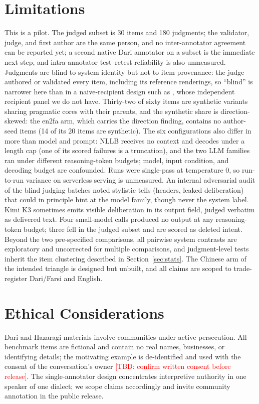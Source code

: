 \documentclass[11pt]{article}
\newcommand{\tbd}[1]{\textcolor{red}{[TBD: #1]}}
\begin{document}
\section{Limitations}
This is a pilot. The judged subset is 30 items and 180 judgments; the validator, judge, and first author are the same person, and no inter-annotator agreement can be reported yet; a second native Dari annotator on a subset is the immediate next step, and intra-annotator test--retest reliability is also unmeasured. Judgments are blind to system identity but not to item provenance: the judge authored or validated every item, including its reference renderings, so ``blind'' is narrower here than in a naive-recipient design such as \citet{tenzer2026pragmatics}, whose independent recipient panel we do not have. Thirty-two of sixty items are synthetic variants sharing pragmatic cores with their parents, and the synthetic share is direction-skewed: the en2fa arm, which carries the direction finding, contains no author-seed items (14 of its 20 items are synthetic). The six configurations also differ in more than model and prompt: NLLB receives no context and decodes under a length cap (one of its scored failures is a truncation), and the two LLM families ran under different reasoning-token budgets; model, input condition, and decoding budget are confounded. Runs were single-pass at temperature 0, so run-to-run variance on serverless serving is unmeasured. An internal adversarial audit of the blind judging batches noted stylistic tells (headers, leaked deliberation) that could in principle hint at the model family, though never the system label. Kimi K3 sometimes emits visible deliberation in its output field, judged verbatim as delivered text. Four small-model calls produced no output at any reasoning-token budget; three fell in the judged subset and are scored as deleted intent. Beyond the two pre-specified comparisons, all pairwise system contrasts are exploratory and uncorrected for multiple comparisons, and judgment-level tests inherit the item clustering described in Section~\ref{sec:stats}. The Chinese arm of the intended triangle is designed but unbuilt, and all claims are scoped to trade-register Dari/Farsi and English.

\section{Ethical Considerations}
Dari and Hazaragi materials involve communities under active persecution. All benchmark items are fictional and contain no real names, businesses, or identifying details; the motivating example is de-identified and used with the consent of the conversation's owner \tbd{confirm written consent before release}. The single-annotator design concentrates interpretive authority in one speaker of one dialect; we scope claims accordingly and invite community annotation in the public release.
\end{document}
